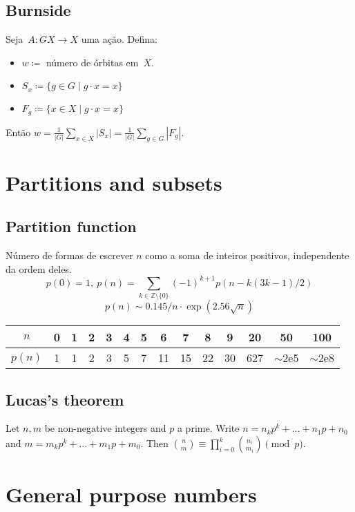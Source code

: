    

	
\subsection{Burnside}
Seja~$A \colon GX \rightarrow X$ uma ação. Defina:
\begin{itemize}
\item $w \coloneqq $ número de órbitas em~$X$.
\item $S_x \coloneqq \{g \in G \mid g \cdot x = x \}$
\item $F_g \coloneqq \{x \in X \mid g \cdot x = x \} $
\end{itemize}
Então $ w = \frac{1}{|G|} \sum\limits_{x \in X}{|S_x|} = \frac{1}{|G|} \sum\limits_{g \in G}{|F_g|}. $

\section{Partitions and subsets}
	\subsection{Partition function}
		Número de formas de escrever $n$ como a soma de inteiros positivos, independente da ordem deles.
		\small
		\[ p(0) = 1,\ p(n) = \sum_{k \in \mathbb Z \setminus \{0\}}{(-1)^{k+1} p(n - k(3k-1) / 2)} \]
		\[ p(n) \sim 0.145 / n \cdot \exp(2.56 \sqrt{n}) \]

		\begin{center}
		\begin{tabular}{c|c@{\ }c@{\ }c@{\ }c@{\ }c@{\ }c@{\ }c@{\ }c@{\ }c@{\ }c@{\ }c@{\ }c@{\ }c}
			$n$    & 0 & 1 & 2 & 3 & 4 & 5 & 6  & 7  & 8  & 9  & 20  & 50  & 100 \\ \hline
			$p(n)$ & 1 & 1 & 2 & 3 & 5 & 7 & 11 & 15 & 22 & 30 & 627 & $\mathtt{\sim}$2e5 & $\mathtt{\sim}$2e8 \\
		\end{tabular}
		\end{center}
		\normalsize
    
    \subsection{Lucas's theorem}
		Let $n,m$ be non-negative integers and $p$ a prime. Write $n=n_k p^k+...+n_1 p+n_0$ and $m=m_k p^k+...+m_1 p + m_0$. Then $\binom{n}{m} \equiv \prod_{i = 0}^k\binom{n_i}{m_i} \pmod{p}$.


\section{General purpose numbers}
